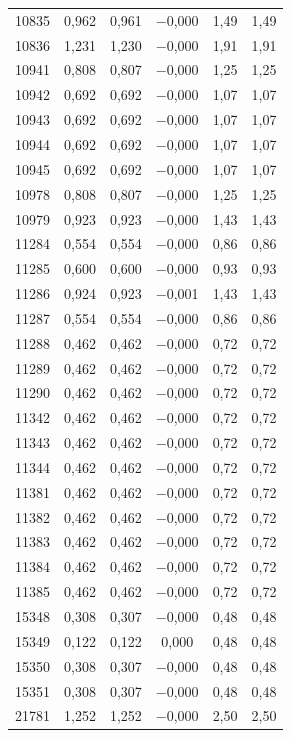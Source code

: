 \begin{longtable}{lccccc}
10835 & 0,962 & 0,961 & $-$0,000 & 1,49 & 1,49 \\
10836 & 1,231 & 1,230 & $-$0,000 & 1,91 & 1,91 \\
10941 & 0,808 & 0,807 & $-$0,000 & 1,25 & 1,25 \\
10942 & 0,692 & 0,692 & $-$0,000 & 1,07 & 1,07 \\
10943 & 0,692 & 0,692 & $-$0,000 & 1,07 & 1,07 \\
10944 & 0,692 & 0,692 & $-$0,000 & 1,07 & 1,07 \\
10945 & 0,692 & 0,692 & $-$0,000 & 1,07 & 1,07 \\
10978 & 0,808 & 0,807 & $-$0,000 & 1,25 & 1,25 \\
10979 & 0,923 & 0,923 & $-$0,000 & 1,43 & 1,43 \\
11284 & 0,554 & 0,554 & $-$0,000 & 0,86 & 0,86 \\
11285 & 0,600 & 0,600 & $-$0,000 & 0,93 & 0,93 \\
11286 & 0,924 & 0,923 & $-$0,001 & 1,43 & 1,43 \\
11287 & 0,554 & 0,554 & $-$0,000 & 0,86 & 0,86 \\
11288 & 0,462 & 0,462 & $-$0,000 & 0,72 & 0,72 \\
11289 & 0,462 & 0,462 & $-$0,000 & 0,72 & 0,72 \\
11290 & 0,462 & 0,462 & $-$0,000 & 0,72 & 0,72 \\
11342 & 0,462 & 0,462 & $-$0,000 & 0,72 & 0,72 \\
11343 & 0,462 & 0,462 & $-$0,000 & 0,72 & 0,72 \\
11344 & 0,462 & 0,462 & $-$0,000 & 0,72 & 0,72 \\
11381 & 0,462 & 0,462 & $-$0,000 & 0,72 & 0,72 \\
11382 & 0,462 & 0,462 & $-$0,000 & 0,72 & 0,72 \\
11383 & 0,462 & 0,462 & $-$0,000 & 0,72 & 0,72 \\
11384 & 0,462 & 0,462 & $-$0,000 & 0,72 & 0,72 \\
11385 & 0,462 & 0,462 & $-$0,000 & 0,72 & 0,72 \\
15348 & 0,308 & 0,307 & $-$0,000 & 0,48 & 0,48 \\
15349 & 0,122 & 0,122 & 0,000 & 0,48 & 0,48 \\
15350 & 0,308 & 0,307 & $-$0,000 & 0,48 & 0,48 \\
15351 & 0,308 & 0,307 & $-$0,000 & 0,48 & 0,48 \\
21781 & 1,252 & 1,252 & $-$0,000 & 2,50 & 2,50 \\

\end{longtable}
